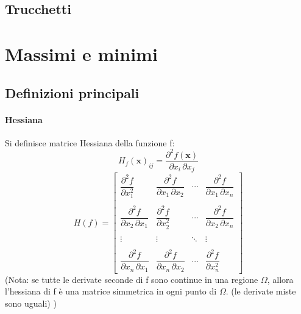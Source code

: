 \documentclass[a4paper,10pt]{book}
\begin{document}
\subsection{Trucchetti}

\section{Massimi e minimi}
\subsection{Definizioni principali}

\paragraph{Hessiana}
Si definisce matrice Hessiana della funzione f:
$$  H_{f}(\mathbf{x})_{ij} = \frac{\partial^2 f(\mathbf{x})}{\partial x_i\, \partial x_j} $$
$$ H(f) = \begin{bmatrix} \dfrac{\partial^2 f}{\partial x_1^2} & \dfrac{\partial^2 f}{\partial x_1\,\partial x_2} & \cdots & \dfrac{\partial^2 f}{\partial x_1\,\partial x_n} \\ \\ \dfrac{\partial^2 f}{\partial x_2\,\partial x_1} & \dfrac{\partial^2 f}{\partial x_2^2} & \cdots & \dfrac{\partial^2 f}{\partial x_2\,\partial x_n} \\ \\ \vdots & \vdots & \ddots & \vdots \\ \\ \dfrac{\partial^2 f}{\partial x_n\,\partial x_1} & \dfrac{\partial^2 f}{\partial x_n\,\partial x_2} & \cdots & \dfrac{\partial^2 f}{\partial x_n^2} \end{bmatrix}$$
(Nota: se tutte le derivate seconde di f sono continue in una regione $\Omega$, allora l'hessiana di f è una matrice simmetrica in ogni punto di $\Omega$. (le derivate miste sono uguali) )
\end{document}
